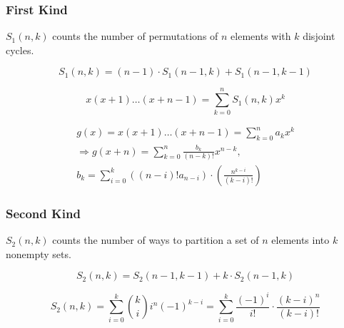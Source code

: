 \subsubsection{First Kind}

$S_1(n, k)$ counts the number of permutations of $n$ elements with $k$ disjoint cycles.

$$
S_1(n, k) = (n - 1) \cdot S_1(n - 1, k) + S_1(n - 1, k - 1)
$$

$$
x (x + 1) \ldots (x + n - 1) = \sum\limits_{k = 0}^n S_1(n, k) x^k
$$

$$
\begin{gathered}
g(x) = x(x + 1) \ldots (x + n - 1) = \sum\limits_{k = 0}^n a_kx^k \\ 
\Rightarrow g(x + n) = \sum\limits_{k = 0}^n \frac{b_k}{(n - k)!} x^{n - k}, \\
b_k = \sum\limits_{i = 0}^k ((n - i)! a_{n - i}) \cdot (\frac{n^{k - i}}{(k - i)!})
\end{gathered}
$$ 

\subsubsection{Second Kind}

$S_2(n, k)$ counts the number of ways to partition a set of $n$ elements into $k$ nonempty sets.

$$
S_2(n, k) = S_2(n - 1, k - 1) + k \cdot S_2(n - 1, k)
$$

$$
S_2(n, k) = \sum\limits_{i = 0}^k \binom{k}{i}i^n (-1)^{k - i} = \sum\limits_{i = 0}^k \frac{(-1)^i}{i!} \cdot \frac{(k - i)^n}{(k - i)!}
$$
